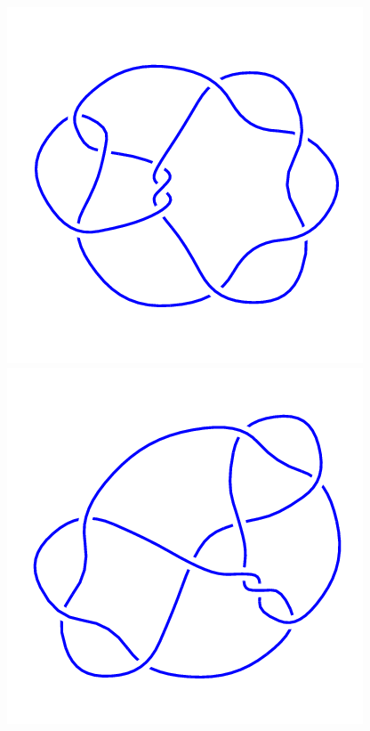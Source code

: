 \begin{figure}[H]
\begin{minipage}[b]{.18\linewidth}
	\end{minipage}
	\begin{minipage}[b]{.18\linewidth}
		\centering
		\includegraphics[width=\linewidth]{../data/10_139.png}
	\end{minipage}
	\begin{minipage}[b]{.18\linewidth}
		\centering
		\includegraphics[width=\linewidth]{../data/10_140.png}

\end{minipage}
\end{figure}
